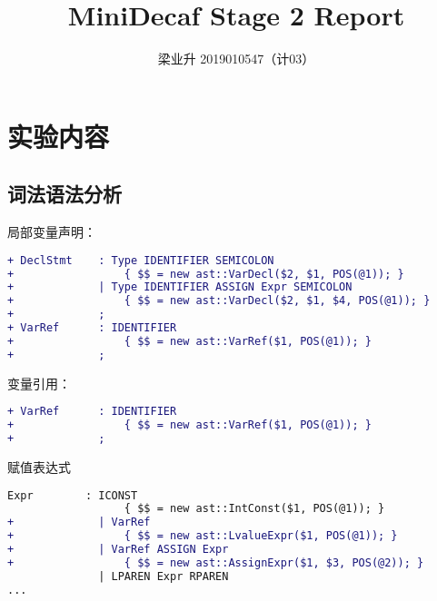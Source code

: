 \documentclass[a4paper]{article}
\author{梁业升 2019010547（计03）}
\begin{document}




\title{MiniDecaf Stage 2 Report}

\maketitle

\section{实验内容}

\subsection{词法语法分析}

局部变量声明：

\begin{lstlisting}[language=diff]
+ DeclStmt    : Type IDENTIFIER SEMICOLON
+                 { $$ = new ast::VarDecl($2, $1, POS(@1)); }
+             | Type IDENTIFIER ASSIGN Expr SEMICOLON
+                 { $$ = new ast::VarDecl($2, $1, $4, POS(@1)); }
+             ;
+ VarRef      : IDENTIFIER
+                 { $$ = new ast::VarRef($1, POS(@1)); }
+             ;
\end{lstlisting}    

变量引用：

\begin{lstlisting}[language=diff]
+ VarRef      : IDENTIFIER
+                 { $$ = new ast::VarRef($1, POS(@1)); }
+             ;
\end{lstlisting}    

赋值表达式

\begin{lstlisting}[language=diff]
  Expr        : ICONST
                  { $$ = new ast::IntConst($1, POS(@1)); }
+             | VarRef
+                 { $$ = new ast::LvalueExpr($1, POS(@1)); }
+             | VarRef ASSIGN Expr
+                 { $$ = new ast::AssignExpr($1, $3, POS(@2)); }
              | LPAREN Expr RPAREN
...
\end{lstlisting}
\end{document}
